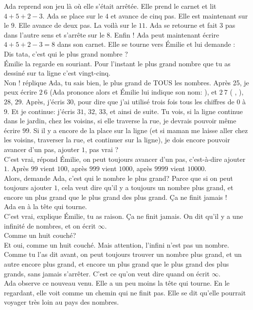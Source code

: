 Ada reprend son jeu là où elle s’était arrêtée. 
Elle prend le carnet et lit $4 + 5 + 2 - 3$. 
Ada se place sur le $4$ et avance de cinq pas. 
Elle est maintenant sur le $9$. 
Elle avance de deux pas. La voilà sur le $11$. 
Ada se retourne et fait $3$ pas dans l’autre sens et s’arrête sur le $8$.
Enfin ! Ada peut maintenant écrire $4 + 5 + 2 - 3 = 8$ dans son carnet.
Elle se tourne vers Émilie et lui demande :\\
\guillemotleft Dis tata, c’est qui le plus grand nombre ? \guillemotright\\
Émilie la regarde en souriant.
\guillemotleft Pour l’instant le plus grand nombre que tu as dessiné sur ta ligne c’est vingt-cinq.\\
\mdash Non ! réplique Ada, tu sais bien, le plus grand de TOUS les nombres. Après 25, je peux écrire $2~6$ (Ada prononce alors  et Émilie lui indique son nom: ), et $2~7$ ( , ), $28$, $29$. Après, j’écris $30$, pour dire que j’ai utilisé trois fois tous les chiffres de $0$ à $9$. Et je continue: j’écris $31$, $32$, $33$, et ainsi de suite. Tu vois, si la ligne continue dans le jardin, chez les voisins, si elle traverse la rue, je devrais pouvoir même écrire $99$. Si il y a encore de la place sur la ligne (et si maman me laisse aller chez les voisins, traverser la rue, et continuer sur la ligne), je dois encore pouvoir avancer d’un pas, ajouter $1$, pas vrai ?\\
\mdash C’est vrai, répond Émilie, on peut toujours avancer d’un pas, c’est-à-dire ajouter $1$. Après $99$ vient $100$, après $999$ vient $1000$, après $9999$ vient $10000$.\\
\mdash Alors, demande Ada, c’est qui le nombre le plus grand? Parce que si on peut toujours ajouter $1$, cela veut dire qu’il y a toujours un nombre plus grand, et encore un plus grand que le plus grand des plus grand. Ça ne finit jamais ! \guillemotright\\ 
Ada en à la tête qui tourne. \\
\guillemotleft C’est vrai, explique Émilie, tu as raison. Ça ne finit jamais. On dit qu’il y a une infinité de nombres, et on écrit $\infty$.\\
\mdash Comme un huit couché?\\
\mdash Et oui, comme un huit couché. Mais attention, l’infini n’est pas un nombre. Comme tu l’as dit avant, on peut toujours trouver un nombre plus grand, et un autre encore plus grand, et encore un plus grand que le plus grand des plus grands, sans jamais s'arrêter. C’est ce qu’on veut dire quand on écrit $\infty$. \guillemotright\\
Ada observe ce nouveau venu. Elle a un peu moins la tête qui tourne. En le regardant, elle voit comme un chemin qui ne finit pas. Elle se dit qu’elle pourrait voyager très loin au pays des nombres.

